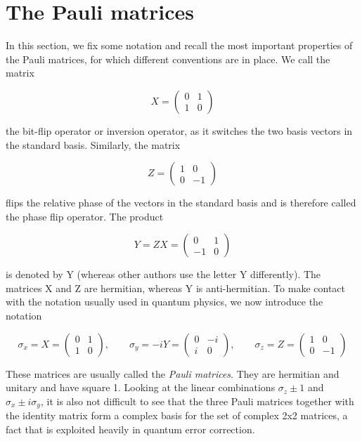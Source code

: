 \documentclass[a4paper, draft]{article}
\theoremstyle{own}
\theoremstyle{remark}
\begin{document}
\appendix


\section{The Pauli matrices}

In this section, we fix some notation and recall the most important properties of the Pauli matrices, for which different conventions are in place. We call the matrix

$$
X = \begin{pmatrix} 0 & 1 \\ 1 & 0\end{pmatrix}
$$

the bit-flip operator or inversion operator, as it switches the two basis vectors in the standard basis. Similarly, the matrix

$$
Z = \begin{pmatrix} 1 & 0 \\ 0 & -1\end{pmatrix}
$$

flips the relative phase of the vectors in the standard basis and is therefore called the phase flip operator. The product

$$
Y = ZX = \begin{pmatrix} 0 & 1 \\ -1 & 0\end{pmatrix}
$$

is denoted by Y (whereas other authors use the letter Y differently). The matrices X and Z are hermitian, whereas Y is anti-hermitian. To make contact with the notation usually used in quantum physics, we now introduce the notation

$$
\sigma_x = X = \begin{pmatrix} 0 & 1 \\ 1 & 0 \end{pmatrix}, \qquad
\sigma_y = -iY = \begin{pmatrix} 0 & -i \\ i & 0 \end{pmatrix}, \qquad
\sigma_z = Z = \begin{pmatrix} 1 & 0 \\ 0 & -1 \end{pmatrix}
$$

These matrices are usually called the \emph{Pauli matrices}. They are hermitian and unitary and have square 1. Looking at the linear combinations $\sigma_z \pm 1$ and $\sigma_x \pm i \sigma_y$, it is also not difficult to see that the three Pauli matrices together with the identity matrix form a complex basis for the set of complex 2x2 matrices, a fact that is exploited heavily in quantum error correction. 
\end{document}
